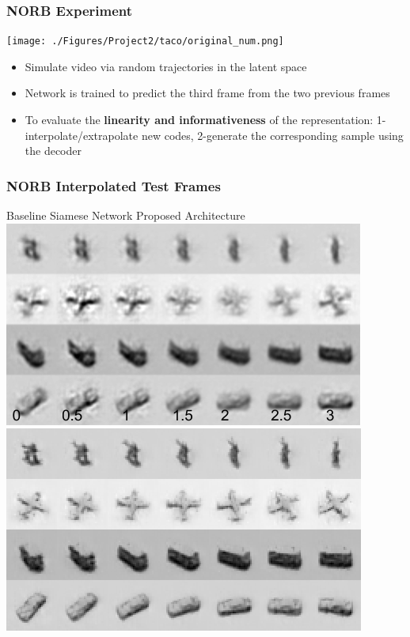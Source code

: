 \documentclass{beamer}
\begin{document}
\begin{frame} 
\frametitle{NORB Experiment} 
\begin{centering} 
\texttt{[image: ./Figures/Project2/taco/original\_num.png]}\\
\end{centering} 
\begin{itemize}
\item Simulate video via random trajectories in the latent space 
\item Network is trained to predict the third frame from the two previous frames 
\item To evaluate the \textbf{linearity and informativeness} of the representation: 1-interpolate/extrapolate new codes, 2-generate the corresponding sample using the decoder
\end{itemize}  
\end{frame} 

\begin{frame} 
\frametitle{NORB Interpolated Test Frames}
\hspace{0.75cm} Baseline Siamese Network \hspace{1.25cm} Proposed Architecture\\
\hspace{0.5cm}\includegraphics[scale=0.3]{./Figures/Project2/taco/siamese_interp_num.png} \hspace{0.5cm} 
\includegraphics[scale=0.3]{./Figures/Project2/taco/interp_pool_best_reg.png}
\end{frame} 
\end{document}
